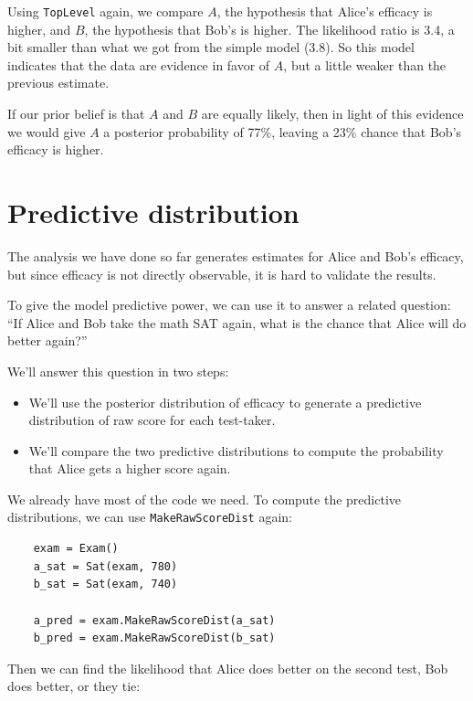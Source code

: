\documentclass[12pt]{book}
\begin{document}
Using {\tt TopLevel} again, we compare $A$, the
hypothesis that Alice's efficacy is higher, and $B$, the
hypothesis that Bob's is higher.  The likelihood ratio is
3.4, a bit smaller than what we got from the simple model (3.8).
So this model indicates that the data are evidence in favor
of $A$, but a little weaker than the previous estimate.

If our prior belief is that $A$ and $B$ are equally likely,
then in light of this evidence we would give $A$ a posterior
probability of 77\%, leaving a 23\% chance that Bob's efficacy
is higher.


\section{Predictive distribution}

The analysis we have done so far generates estimates for
Alice and Bob's efficacy, but since efficacy is not directly
observable, it is hard to validate the results.

To give the model predictive power, we can use it to answer
a related question: ``If Alice and Bob take the math SAT
again, what is the chance that Alice will do better again?''

We'll answer this question in two steps:

\begin{itemize}

\item We'll use the posterior distribution of efficacy to
generate a predictive distribution of raw score for each test-taker.

\item We'll compare the two predictive distributions to compute
the probability that Alice gets a higher score again.

\end{itemize}

We already have most of the code we need.  To compute
the predictive distributions, we can use \verb"MakeRawScoreDist" again:

\begin{verbatim}
    exam = Exam()
    a_sat = Sat(exam, 780)
    b_sat = Sat(exam, 740)

    a_pred = exam.MakeRawScoreDist(a_sat)
    b_pred = exam.MakeRawScoreDist(b_sat)
\end{verbatim}

Then we can find the likelihood that Alice does better on the second
test, Bob does better, or they tie:
\end{document}
